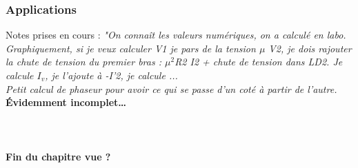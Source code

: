 		\subsubsection{Applications}
		Notes prises en cours : \textit{"On connaît les valeurs numériques, 
		on a calculé en labo. Graphiquement, si je veux calculer V1 je pars 
		de la tension $\mu$ V2, je dois rajouter la chute de tension du 
		premier bras : $\mu^2$R2 I2 + chute de tension dans LD2. Je calcule 
		$I_v$, je l'ajoute à -I'2, je calcule ...\\
		Petit calcul de phaseur pour avoir ce qui se passe d'un coté à partir 
		de l'autre.}\\
		\textbf{Évidemment incomplet\dots}\\
		\\
		\\
		\\
		\textbf{Fin du chapitre vue ?}